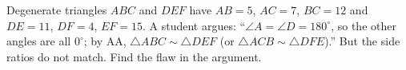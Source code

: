 Degenerate triangles $ABC$ and $DEF$ have $AB=5$, $AC=7$, $BC=12$ and $DE=11$, $DF=4$, $EF=15$. A student argues: ``$\angle A=\angle D=180^\circ$, so the other angles are all $0^\circ$; by AA, $\triangle ABC\sim\triangle DEF$ (or $\triangle ACB\sim\triangle DFE$).'' But the side ratios do not match. Find the flaw in the argument.
